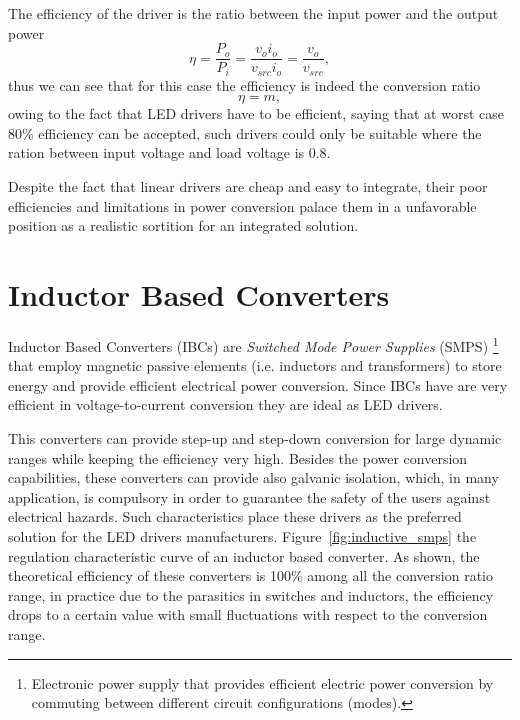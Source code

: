    The efficiency of the driver is the ratio between the input power and the output power
   \begin{equation}
        \eta = \frac{P_o}{P_i} = \frac{v_o i_o}{v_{src} i_o} = \frac{v_o}{v_{src}},
   \end{equation}
   thus we can see that for this case the efficiency is indeed the conversion ratio
   \begin{equation}
        \eta = m,
   \end{equation}
   owing to the fact that LED drivers have to be efficient, saying that at worst case 80\% efficiency can be accepted, such drivers could only be suitable where the ration between input voltage and load voltage is 0.8.

   Despite the fact that linear drivers are cheap and easy to integrate, their poor efficiencies and limitations in power conversion palace them in a unfavorable position as a realistic sortition for an integrated solution.

\section{Inductor Based Converters}

Inductor Based Converters (IBCs) are \emph{Switched Mode Power Supplies} (SMPS) \footnote{Electronic power supply that provides efficient electric power conversion by commuting between different circuit configurations (modes).}  that employ magnetic passive elements (i.e. inductors and transformers) to store energy and provide efficient electrical power conversion. Since IBCs have are very efficient in voltage-to-current conversion they are ideal as LED drivers.

This converters can provide step-up and step-down conversion for large dynamic ranges while keeping the efficiency very high. Besides the power conversion capabilities, these converters can provide also galvanic isolation, which, in many application, is compulsory in order to guarantee the safety of the users against electrical hazards. Such characteristics place these drivers as the preferred solution for the LED drivers manufacturers. Figure~\ref{fig:inductive_smps} the regulation characteristic curve of an inductor based converter. As shown, the theoretical efficiency of these converters is 100\% among all the conversion ratio range, in practice due to the parasitics in switches and inductors, the efficiency drops to a certain value with small fluctuations with respect to the conversion range.

